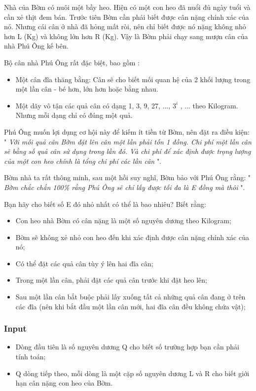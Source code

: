 



   Nhà của Bờm có nuôi một bầy heo. Hiện có một con heo đã nuổi đủ ngày tuổi và cần xẻ thịt đem bán. Trước tiên Bờm cần phải biết được cân nặng chính xác của nó. Nhưng cái cân ở nhà đã hỏng mất ròi, nên chỉ biết được nó nặng không nhỏ hơn L (Kg) và không lớn hơn R (Kg). Vậy là Bờm phải chạy sang mượn cân của nhà Phú Ông kế bên.  

   Bộ cân nhà Phú Ông rất đặc biệt, bao gồm :  
\begin{itemize}
	\item     Một cân đĩa thăng bằng: Cân sẽ cho biết mối quan hệ của 2 khối lượng trong một lần cân - bé hơn, lớn hơn hoặc bằng nhau.   
	\item     Một dãy vô tận các quả cân có dạng 1, 3, 9, 27, ..., $3^{i}$    , ... theo Kilogram. Nhưng mỗi dạng chỉ có đúng một quả.   
\end{itemize}

   Phú Ông muốn lợi dụng cơ hội này để kiếm ít tiền từ Bờm, nên đặt ra điều kiện: "   \emph{    Với mỗi quả cân Bờm đặt lên cân một lần phải tốn 1 đồng. Chi phí một lần cân sẽ bằng số quả cân sử dụng trong lần đó. Và chi phí để xác định được trọng lượng của một con heo chính là tổng chi phí các lần cân   }   ".  

   Bờm nhà ta rất thông minh, sau một hồi suy nghĩ, Bờm bảo với Phú Ông rằng: "   \emph{    Bờm chắc chắn 100\% rằng Phú Ông sẽ chỉ lấy được tối đa là E đồng mà thôi   }   ".  

   Bạn hãy cho biết số E đó nhỏ nhất có thể là bao nhiêu? Biết rằng:  
\begin{itemize}
	\item     Con heo nhà Bờm có cân nặng là một số nguyên dương theo Kilogram;   
	\item     Bờm sẽ không xẻ nhỏ con heo đến khi xác định được cân nặng chính xác của nó;   
	\item     Có thể đặt các quả cân tùy ý lên hai đĩa cân;   
	\item     Trong một lần cân, phải đặt các quả cân trước khi đặt heo lên;   
	\item     Sau một lần cân bắt buộc phải lấy xuống tất cả những quả cân đang ở trên  các đĩa (nên khi bắt đầu một lần cân mới, hai đĩa cân đều không chứa  vật);   
\end{itemize}

\subsubsection{   Input  }
\begin{itemize}
	\item     Dòng đầu tiên là số nguyên dương Q cho biết số trường hợp bạn cần phải tính toán;   
	\item     Q dòng tiếp theo, mỗi dòng là một cặp số nguyên dương L và R cho biết giới hạn cân nặng con heo của Bờm.   
\end{itemize}

